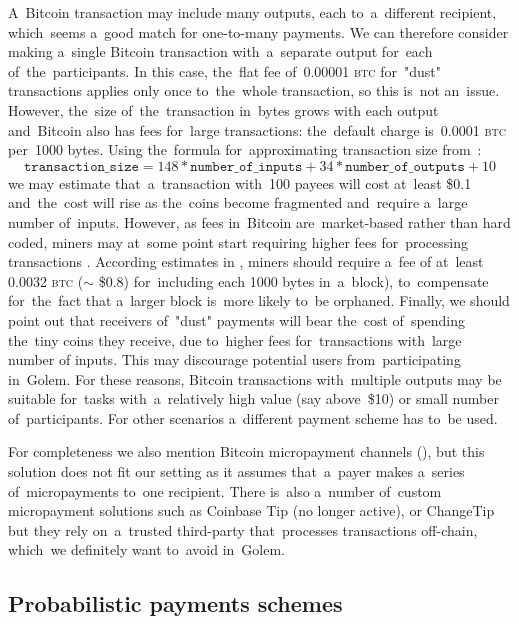 \documentclass[a4paper]{article}
\newcommand{\BTC}{\textsc{btc}}
\begin{document}
    A~Bitcoin transaction may include many outputs, each to~a~different recipient, which~seems a~good match for
    one-to-many payments. We can therefore consider making a~single Bitcoin transaction with~a~separate output
    for~each of~the~participants. In this case, the~flat fee of~0.00001 \BTC{} for~"dust" transactions applies only
    once to~the~whole transaction, so this  is~not an~issue. However, the~size of~the~transaction in~bytes grows with
    each output and~Bitcoin also has fees for~large transactions: the~default charge  is~0.0001 \BTC{} per~1000 bytes.
    Using the~formula for~approximating transaction size from~\cite{BITFEE}:
    \begin{displaymath}
      \texttt{transaction\_size} = 148 * \texttt{number\_of\_inputs} + 34 * \texttt{number\_of\_outputs} + 10
    \end{displaymath}
    we may estimate that~a~transaction with~100 payees will cost at~least \$0.1 and~the~cost will rise as the~coins
    become fragmented and~require a~large number of~inputs. However, as fees in~Bitcoin are~market-based rather than
    hard coded, miners may at~some point start requiring higher fees for~processing transactions \cite{KASKALOGLU}.
    According estimates in \cite{ANDRESEN}, miners should require a~fee of
    at~least 0.0032 \BTC{} ($\sim$ \$0.8) for~including each 1000 bytes in~a~block), to~compensate for~the~fact that
    a~larger block  is~more likely to~be orphaned. Finally, we should point out that receivers of~"dust" payments will
    bear the~cost of~spending the~tiny coins they receive, due to~higher fees for~transactions with~large number of
    inputs. This may discourage potential users from~participating in~Golem. For these reasons, Bitcoin transactions
    with~multiple outputs may be suitable for~tasks with~a~relatively high value (say above~\$10) or small number
    of~participants. For other scenarios a~different payment scheme has to~be used.

    For completeness we also mention Bitcoin micropayment channels (\cite{BITCOINJ}), but this solution does not fit
    our setting as it assumes that~a~payer makes a~series of~micropayments to~one recipient.
    There  is~also a~number of~custom micropayment solutions such as Coinbase Tip \cite{COINTIP}(no longer active),
    or ChangeTip \cite{CHANGETIP} but they rely on~a~trusted third-party that~processes transactions off-chain,
    which~we definitely want to~avoid in~Golem.

\subsection{Probabilistic payments schemes}
\end{document}
